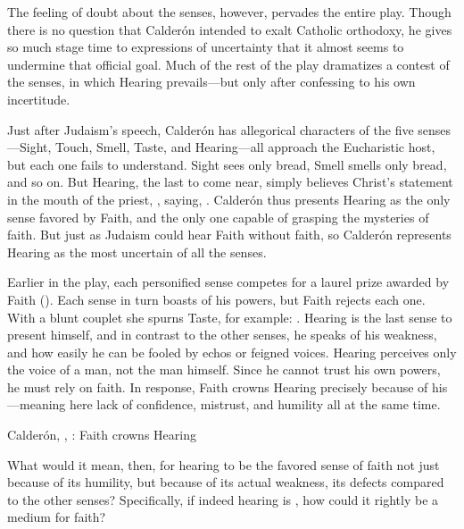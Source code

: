 The feeling of doubt about the senses, however, pervades the entire play.
Though there is no question that Calderón intended to exalt Catholic orthodoxy, he gives so much stage time to expressions of uncertainty that it almost seems to undermine that official goal.
Much of the rest of the play dramatizes a contest of the senses, in which Hearing prevails---but only after confessing to his own incertitude.

Just after Judaism's speech, Calderón has allegorical characters of the five senses---Sight, Touch, Smell, Taste, and Hearing---all approach the Eucharistic host, but each one fails to understand.
Sight sees only bread, Smell smells only bread, and so on.
But Hearing, the last to come near, simply believes Christ's statement in the mouth of the priest, , saying, .%
  \autocite[: ]{Calderon:Retiro}
Calderón thus presents Hearing as the only sense favored by Faith, and the only one capable of grasping the mysteries of faith.
But just as Judaism could hear Faith without faith, so Calderón represents Hearing as the most uncertain of all the senses.

Earlier in the play, each personified sense competes for a laurel prize awarded by Faith ().
Each sense in turn boasts of his powers, but Faith rejects each one.
With a blunt couplet she spurns Taste, for example: .%
  \autocite[]{Calderon:Retiro}
Hearing is the last sense to present himself, and in contrast to the other senses, he speaks of his weakness, and how easily he can be fooled by echos or feigned voices.
Hearing perceives only the voice of a man, not the man himself.
Since he cannot trust his own powers, he must rely on faith.
In response, Faith crowns Hearing precisely because of his ---meaning here lack of confidence, mistrust, and humility all at the same time.

\begin{expoem}
\caption{Calderón, , : Faith crowns Hearing}
\label{expoem:Calderon-Retiro-Hearing}
\end{expoem}

What would it mean, then, for hearing to be the favored sense of faith not just because of its humility, but because of its actual weakness, its defects compared to the other senses?
Specifically, if indeed hearing is , how could it rightly be a medium for faith?

